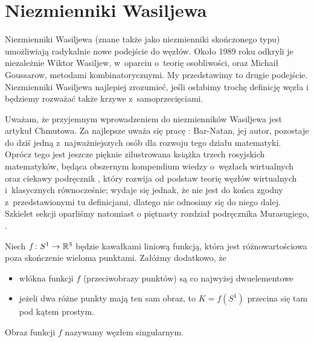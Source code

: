 \section{Niezmienniki Wasiljewa} %
\label{sec:vassiliev}
Niezmienniki Wasiljewa (znane także jako niezmienniki skończonego typu) umożliwiają radykalnie nowe podejście do węzłów.
Około 1989 roku odkryli je niezależnie Wiktor Wasiljew, w~oparciu o~teorię osobliwości, oraz Michaił Goussarow, metodami kombinatorycznymi.
My przedstawimy to drugie podejście.
Niezmienniki Wasiljewa najlepiej zrozumieć, jeśli osłabimy trochę definicję węzła i będziemy rozważać także krzywe z~samoprzecięciami.

Uważam, że przyjemnym wprowadzeniem do niezmienników Wasiljewa jest artykuł \cite{chmutov12} Chmutowa.
Za najlepsze uważa się pracę \cite{barnatan_95}: Bar-Natan, jej autor, pozostaje do dziś jedną z~najważniejszych osób dla rozwoju tego działu matematyki.
Oprócz tego jest jeszcze pięknie zilustrowana książka \cite{duzhin12} trzech rosyjskich matematyków, będąca obszernym kompendium wiedzy o~węzłach wirtualnych oraz ciekawy podręcznik \cite{dye16}, który rozwija od podstaw teorię węzłów wirtualnych i~klasycznych równocześnie; wydaje się jednak, że nie jest do końca zgodny z~przedstawionymi tu definicjami, dlatego nie odnosimy się do niego dalej.
Szkielet sekcji oparliśmy natomiast o piętnasty rozdział podręcznika Murasugiego, \cite{murasugi96}.

\begin{definition}
    Niech $f \colon S^1 \to \mathbb R^3$ będzie kawałkami liniową funkcją, która jest różnowartościowa poza skończenie wieloma punktami.
    Załóżmy dodatkowo, że
    \begin{itemize}
        \item włókna funkcji $f$ (przeciwobrazy punktów) są co najwyżej dwuelementowe
        \item jeżeli dwa różne punkty mają ten sam obraz, to $K = f(S^1)$ przecina się tam pod kątem prostym.
    \end{itemize}
    Obraz funkcji $f$ nazywamy węzłem singularnym.
\end{definition}

